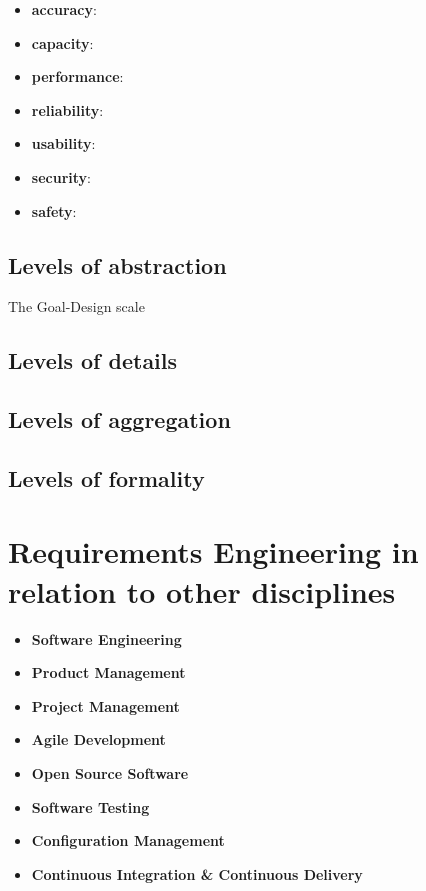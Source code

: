 \begin{itemize}
  \item \textbf{accuracy}:
  \item \textbf{capacity}:
  \item \textbf{performance}:
  \item \textbf{reliability}:
  \item \textbf{usability}:
  \item \textbf{security}:
  \item \textbf{safety}:
\end{itemize}

\subsection*{Levels of abstraction}
The Goal-Design scale
\subsection*{Levels of details}

\subsection*{Levels of aggregation}

\subsection*{Levels of formality}



\section*{Requirements Engineering in relation to other disciplines}

\begin{itemize}
  \item \textbf{Software Engineering}
  \item \textbf{Product Management}
  \item \textbf{Project Management}
  \item \textbf{Agile Development}
  \item \textbf{Open Source Software}
  \item \textbf{Software Testing}
  \item \textbf{Configuration Management}
  \item \textbf{Continuous Integration \& Continuous Delivery}
\end{itemize}

